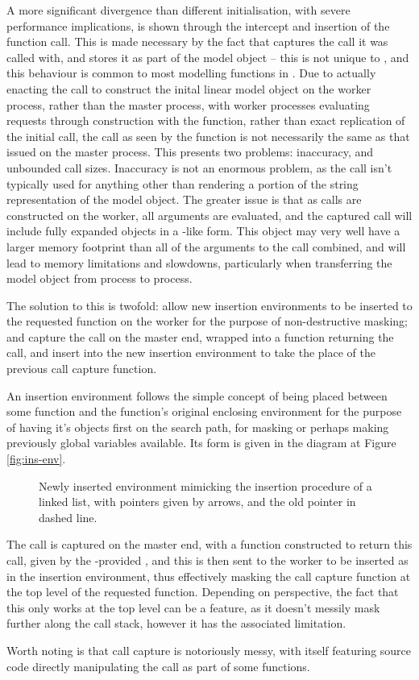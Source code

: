 A more significant divergence than different initialisation, with severe performance implications, is shown through the intercept and insertion of the function call.
This is made necessary by the fact that  captures the call it was called with, and stores it as part of the model object -- this is not unique to , and this behaviour is common to most modelling functions in \R{}.
Due to actually enacting the call to construct the inital  linear model object on the worker process, rather than the master process, with worker processes evaluating requests through construction with the  function, rather than exact replication of the initial call, the call as seen by the function is not necessarily the same as that issued on the master process.
This presents two problems: inaccuracy, and unbounded call sizes.
Inaccuracy is not an enormous problem, as the call isn't typically used for anything other than rendering a portion of the string representation of the model object.
The greater issue is that as calls are constructed on the worker, all arguments are evaluated, and the captured call will include fully expanded objects in a -like form.
This object may very well have a larger memory footprint than all of the arguments to the call combined, and will lead to memory limitations and slowdowns, particularly when transferring the model object from process to process.

The solution to this is twofold: allow new insertion environments to be inserted to the requested function on the worker for the purpose of non-destructive masking; and capture the call on the master end, wrapped into a function returning the call, and insert into the new insertion environment to take the place of the previous call capture function.

An insertion environment follows the simple concept of being placed between some function and the function's original enclosing environment for the purpose of having it's objects first on the search path, for masking or perhaps making previously global variables available.
Its form is given in the diagram at Figure \ref{fig:ins-env}.

\begin{figure}

\caption{Newly inserted environment mimicking the insertion procedure of a linked list, with pointers given by arrows, and the old pointer in dashed line.}
\end{figure}


The call is captured on the master end, with a function constructed to return this call, given by the \lsr{}-provided , and this is then sent to the worker to be inserted as  in the insertion environment, thus effectively masking the call capture function at the top level of the requested  function.
Depending on perspective, the fact that this only works at the top level can be a feature, as it doesn't messily mask further along the call stack, however it has the associated limitation.

Worth noting is that call capture is notoriously messy, with  itself featuring source code directly manipulating the call as part of some functions.


